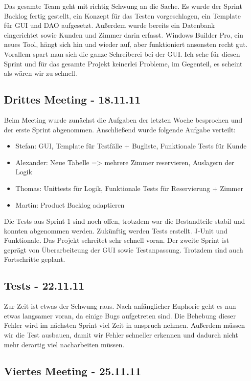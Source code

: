 \documentclass[11pt]{scrartcl}
\begin{document}
Das gesamte Team geht mit richtig Schwung an die Sache. Es wurde der Sprint Backlog fertig gestellt, ein Konzept für das Testen vorgeschlagen, ein Template für GUI und DAO aufgesetzt. Außerdem wurde bereits ein Datenbank eingerichtet sowie Kunden und Zimmer darin erfasst. Windows Builder Pro, ein neues Tool, hängt sich hin und wieder auf, aber funktioniert ansonsten recht gut. Vorallem spart man sich die ganze Schreiberei bei der GUI. Ich sehe für diesen Sprint und für das gesamte Projekt keinerlei Probleme, im Gegenteil, es scheint als wären wir zu schnell.

\subsection{Drittes Meeting - 18.11.11}

Beim Meeting wurde zunächst die Aufgaben der letzten Woche besprochen und der erste Sprint abgenommen. Anschließend wurde folgende Aufgabe verteilt:
\begin{itemize}
\item Stefan: GUI, Template für Testfälle + Bugliste, Funktionale Tests für Kunde
\item Alexander: Neue Tabelle => mehrere Zimmer reservieren, Auslagern der Logik
\item Thomas: Unittests für Logik, Funktionale Tests für Reservierung + Zimmer
\item Martin: Product Backlog adaptieren
\end{itemize}

Die Tests aus Sprint 1 sind noch offen, trotzdem war die Bestandteile stabil und konnten abgenommen werden. Zukünftig werden Tests erstellt. J-Unit und Funktionale.
Das Projekt schreitet sehr schnell voran. Der zweite Sprint ist geprägt von Überarbeiteung der GUI sowie Testanpassung. Trotzdem sind auch Fortschritte geplant. 

\subsection{Tests - 22.11.11}

Zur Zeit ist etwas der Schwung raus. Nach anfänglicher Euphorie geht es nun etwas langsamer voran, da einige Bugs aufgetreten sind. Die Behebung dieser Fehler wird im nächsten Sprint viel Zeit in anspruch nehmen. Außerdem müssen wir die Test ausbauen, damit wir Fehler schneller erkennen und dadurch nicht mehr derartig viel nacharbeiten müssen.

\subsection{Viertes Meeting - 25.11.11}
\end{document}
